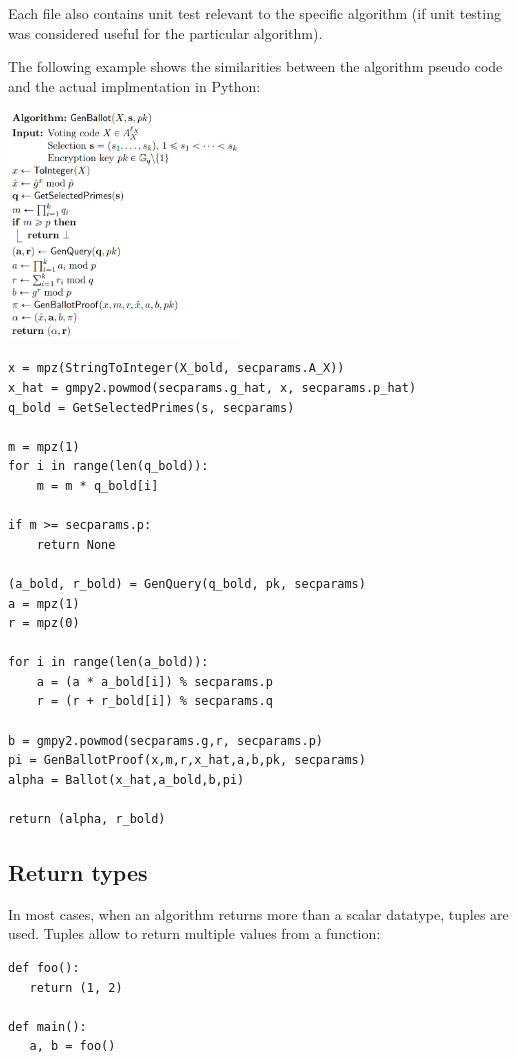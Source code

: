 Each file also contains unit test relevant to the specific algorithm (if unit testing was considered useful for the particular algorithm).

The following example shows the similarities between the algorithm pseudo code and the actual implmentation in Python:

\begin{multicols}{2}
\includegraphics[width=0.46\textwidth]{assets/genballot.png}
\columnbreak
\begin{verbatim}
x = mpz(StringToInteger(X_bold, secparams.A_X))
x_hat = gmpy2.powmod(secparams.g_hat, x, secparams.p_hat)
q_bold = GetSelectedPrimes(s, secparams)

m = mpz(1)
for i in range(len(q_bold)):
    m = m * q_bold[i]

if m >= secparams.p:
    return None

(a_bold, r_bold) = GenQuery(q_bold, pk, secparams)
a = mpz(1)
r = mpz(0)

for i in range(len(a_bold)):
    a = (a * a_bold[i]) % secparams.p
    r = (r + r_bold[i]) % secparams.q

b = gmpy2.powmod(secparams.g,r, secparams.p)
pi = GenBallotProof(x,m,r,x_hat,a,b,pk, secparams)
alpha = Ballot(x_hat,a_bold,b,pi)

return (alpha, r_bold)
\end{verbatim}
\end{multicols}

\subsection{Return types}
In most cases, when an algorithm returns more than a scalar datatype, tuples are used. Tuples allow to return multiple values from a function:

\begin{verbatim}
def foo():
   return (1, 2)

def main():
   a, b = foo()
\end{verbatim}

